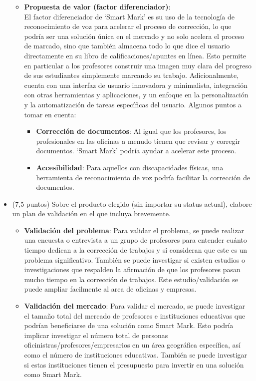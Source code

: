 \documentclass[a4paper,12pt]{article}
\begin{document}
\begin{itemize}
\begin{itemize}
\item \textbf{Propuesta de valor (factor diferenciador)}: \\
El factor diferenciador de ‘Smart Mark’ es su uso de la tecnología de reconocimiento de voz para acelerar el proceso de corrección, lo que podría ser una solución única en el mercado y no solo acelera el proceso de marcado, sino que también almacena todo lo que dice el usuario directamente en su libro de calificaciones/apuntes en línea. Esto permite en particular a los profesores construir una imagen muy clara del progreso de sus estudiantes simplemente marcando su trabajo. Adicionalmente, cuenta con una interfaz de usuario innovadora y minimalista, integración con otras herramientas y aplicaciones, y un enfoque en la personalización y la automatización de tareas específicas del usuario. Algunos puntos a tomar en cuenta:
\begin{itemize}
\item \textbf{Corrección de documentos}: Al igual que los profesores, los profesionales en las oficinas a menudo tienen que revisar y corregir documentos. ‘Smart Mark’ podría ayudar a acelerar este proceso.\\

\item \textbf{Accesibilidad}: Para aquellos con discapacidades físicas, una herramienta de reconocimiento de voz podría facilitar la corrección de documentos.
\end{itemize}
\end{itemize}

\item (7,5 puntos) Sobre el producto elegido (sin importar su status actual), elabore un plan de validación en el que incluya brevemente.

\begin{itemize}
\item \textbf{Validación del problema}: Para validar el problema, se puede realizar una encuesta o entrevista a un grupo de profesores para entender cuánto tiempo dedican a la corrección de trabajos y si consideran que este es un problema significativo. También se puede investigar si existen estudios o investigaciones que respalden la afirmación de que los profesores pasan mucho tiempo en la corrección de trabajos. Este estudio/validación se puede ampliar facilmente al area de oficinas y empresas.

\item \textbf{Validación del mercado}: Para validar el mercado, se puede investigar el tamaño total del mercado de profesores e instituciones educativas que podrían beneficiarse de una solución como Smart Mark. Esto podría implicar investigar el número total de personas oficinistras/profesores/empresarios en un área geográfica específica, así como el número de instituciones educativas. También se puede investigar si estas instituciones tienen el presupuesto para invertir en una solución como Smart Mark.


\end{itemize}
\end{itemize}
\end{document}
